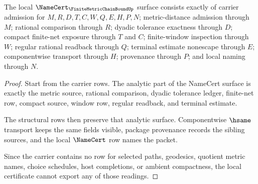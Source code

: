 \begin{theorem}
\label{thm:finite-metric-chain-bound-namecert-surface}
The local $\NameCert_{\FiniteMetricChainBoundUp}$ surface consists exactly of carrier admission for $M,R,D,T,C,W,Q,E,H,P,N$; metric-distance admission through $M$; rational comparison through $R$; dyadic tolerance exactness through $D$; compact finite-net exposure through $T$ and $C$; finite-window inspection through $W$; regular rational readback through $Q$; terminal estimate nonescape through $E$; componentwise transport through $H$; provenance through $P$; and local naming through $N$.
\end{theorem}
\begin{proof}
Start from the carrier rows. The analytic part of the NameCert surface is exactly the metric source, rational comparison, dyadic tolerance ledger, finite-net row, compact source, window row, regular readback, and terminal estimate.

The structural rows then preserve that analytic surface. Componentwise $\hsame$ transport keeps the same fields visible, package provenance records the sibling sources, and the local $\NameCert$ row names the packet.

Since the carrier contains no row for selected paths, geodesics, quotient metric names, choice schedules, host completions, or ambient compactness, the local certificate cannot export any of those readings.
\end{proof}




